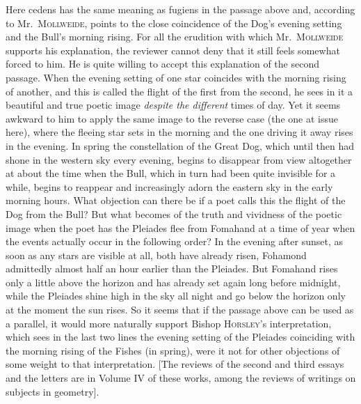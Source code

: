 \noindent Here cedens has the same meaning as fugiens in the passage above and, according to Mr.\ \textsc{Mollweide}, points to the close coincidence of the Dog’s evening setting and the Bull’s morning rising. For all the erudition with which Mr.\ \textsc{Mollweide} supports his explanation, the reviewer cannot deny that it still feels somewhat forced to him. He is quite willing to accept this explanation of the second passage. When the evening setting of one star coincides with the morning rising of another, and this is called the flight of the first from the second, he sees in it a beautiful and true poetic image \emph{despite the different} times of day. Yet it seems awkward to him to apply the same image to the reverse case (the one at issue here), where the fleeing star sets in the morning and the one driving it away rises in the evening. In spring the constellation of the Great Dog, which until then had shone in the western sky every evening, begins to disappear from view altogether at about the time when the Bull, which in turn had been quite invisible for a while, begins to reappear and increasingly adorn the eastern sky in the early morning hours. What objection can there be if a poet calls this the flight of the Dog from the Bull? But what becomes of the truth and vividness of the poetic image when the poet has the Pleiades flee from Fomahand at a time of year when the events actually occur in the following order? In the evening after sunset, as soon as any stars are visible at all, both have already risen, Fohamond admittedly almost half an hour earlier than the Pleiades. But Fomahand rises only a little above the horizon and has already set again long before midnight, while the Pleiades shine high in the sky all night and go below the horizon only at the moment the sun rises. So it seems that if the passage above can be used as a parallel, it would more naturally support Bishop \textsc{Horsley}’s interpretation, which sees in the last two lines the evening setting of the Pleiades coinciding with the morning rising of the Fishes (in spring), were it not for other objections of some weight to that interpretation. [The reviews of the second and third essays and the letters are in Volume IV of these works, among the reviews of writings on subjects in geometry].
